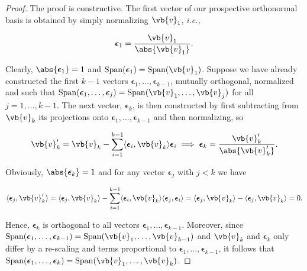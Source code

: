 \documentclass[a4paper,12pt]{report}
\begin{document}
\begin{proof}
The proof is constructive. The first vector of our prospective orthonormal basis is obtained by simply normalizing \(\vb{v} _{1} \), \textit{i.e.,}

\begin{equation}
    \boldsymbol{\epsilon }_{1} = \frac{\vb{v} _{1} }{\abs{\vb{v} _{1} } }.   
\end{equation}

Clearly, \(\abs{\boldsymbol{\epsilon}_1} = 1\) and \(\operatorname{Span}(\boldsymbol{\epsilon}_1) = \operatorname{Span}(\vb{v}_1)\). Suppose we have already constructed the first \(k - 1\) vectors \(\boldsymbol{\epsilon}_1, \ldots, \boldsymbol{\epsilon}_{k-1}\), mutually orthogonal, normalized and such that \(\operatorname{Span}(\boldsymbol{\epsilon}_1, \ldots, \boldsymbol{\epsilon}_j) = \operatorname{Span}(\vb{v}_1, \ldots, \vb{v}_j)\) for all \(j = 1, \ldots, k - 1\). The next vector, \(\boldsymbol{\epsilon}_k\), is then constructed by first subtracting from \(\vb{v}_k\) its projections onto \(\boldsymbol{\epsilon}_1, \ldots, \boldsymbol{\epsilon}_{k-1}\) and then normalizing, so

\begin{equation}
\vb{v}'_k = \vb{v}_k - \sum_{i=1}^{k-1} \langle \boldsymbol{\epsilon}_i, \vb{v}_k \rangle \boldsymbol{\epsilon}_i \implies \boldsymbol{\epsilon}_k = \frac{\vb{v}'_k}{\abs{\vb{v}'_k}}.
\end{equation}

Obviously, \(\abs{\boldsymbol{\epsilon}_k} = 1\) and for any vector \(\boldsymbol{\epsilon}_j\) with \(j < k\) we have

\begin{equation}
\langle \boldsymbol{\epsilon}_j, \vb{v}'_k \rangle = \langle \boldsymbol{\epsilon}_j, \vb{v}_k \rangle - \sum_{i=1}^{k-1} \langle \boldsymbol{\epsilon}_i, \vb{v}_k \rangle \langle \boldsymbol{\epsilon}_j, \boldsymbol{\epsilon}_i \rangle = \langle \boldsymbol{\epsilon}_j, \vb{v}_k \rangle - \langle \boldsymbol{\epsilon}_j, \vb{v}_k \rangle = 0.
\end{equation}

Hence, \(\boldsymbol{\epsilon}_k\) is orthogonal to all vectors \(\boldsymbol{\epsilon}_1, \ldots, \boldsymbol{\epsilon}_{k-1}\). Moreover, since \(\operatorname{Span}(\boldsymbol{\epsilon}_1, \ldots, \boldsymbol{\epsilon}_{k-1}) = \operatorname{Span}(\vb{v}_1, \ldots, \vb{v}_{k-1})\) and \(\vb{v}_k\) and \(\boldsymbol{\epsilon}_k\) only differ by a re-scaling and terms proportional to \(\boldsymbol{\epsilon}_1, \ldots, \boldsymbol{\epsilon}_{k-1}\), it follows that \(\operatorname{Span}(\boldsymbol{\epsilon}_1, \ldots, \boldsymbol{\epsilon}_k) = \operatorname{Span}(\vb{v}_1, \ldots, \vb{v}_k)\). 


\end{proof}
\end{document}
